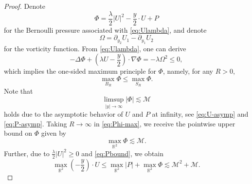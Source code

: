 \documentclass[12pt,reqno]{amsart}
\theoremstyle{plain}
\theoremstyle{definition}
\newcommand{\R}{\mathbb{R}}
\newcommand{\M}{\mathcal{M}}
\renewcommand{\:}{\colon}
\numberwithin{equation}{section}
\numberwithin{figure}{section}
\begin{document}
\begin{proof}
	Denote
	\begin{equation}
		\Phi = \frac{\lambda}{2} |U|^2 - \frac{y}{2} \cdot U + P
	\end{equation}
	for the Bernoulli pressure associated with \eqref{eq:Ulambda}, and denote
	\begin{equation}
		\Omega = \partial_{y_2} U_1 - \partial_{y_1} U_2
	\end{equation}
	for the vorticity function.   From \eqref{eq:Ulambda}, one can derive
	\begin{equation}
		-\Delta \Phi + (\lambda U -  \frac{y}{2}) \cdot \nabla \Phi = - \lambda \Omega^2 \le 0,
	\end{equation}
	which implies the one-sided maximum principle for $\Phi$, namely, for any $R>0$,
	\begin{equation} \label{eq:Phi-max}
		\max_{B_R} \Phi \le \max_{S_R} \Phi.
	\end{equation}
	Note that 
	\begin{equation}
		\limsup_{|y| \to \infty} |\Phi| \lesssim \M
	\end{equation} 
	holds due to the asymptotic behavior of $U$ and $P$ at infinity,  see \eqref{eq:U-asymp} and \eqref{eq:P-asymp}. Taking $R \to \infty$ in \eqref{eq:Phi-max}, we receive the pointwise upper bound on $\Phi$ given by
	\begin{equation}
		\max_{\R^2} \Phi \lesssim \M.
	\end{equation}
	Further, due to $\frac{\lambda}{2}|U|^2 \ge 0$ and \eqref{eq:Pbound}, we obtain
	\begin{equation} \label{eq:yU-upper}
		\max_{\R^2} (-\frac{y}{2}) \cdot U \le \max_{\R^2} |P| + \max_{\R^2} \Phi \lesssim \M^2+\M.
	\end{equation}
	

\end{proof}
\end{document}
